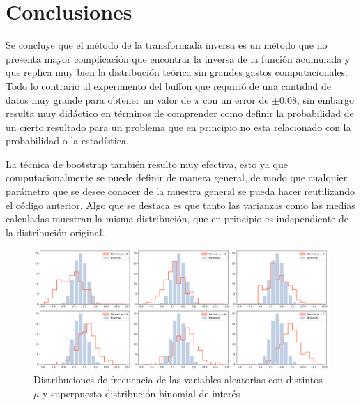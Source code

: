 \documentclass[baaa]{baaa}
\begin{document}
\section{Conclusiones}
Se concluye que el método de la transformada inversa es un método que no presenta mayor complicación que encontrar la inversa de la función acumulada y que replica muy bien la distribución teórica sin grandes gastos computacionales. Todo lo contrario al experimento del buffon que requirió de una cantidad de datos muy grande para obtener un valor de $\pi$ con un error de $\pm0.08$, sin embargo resulta muy didáctico en términos de comprender como definir la probabilidad de un cierto resultado para un problema que en principio no esta relacionado con la probabilidad o la estadística.

La técnica de bootstrap también resulto muy efectiva, esto ya que computacionalmente se puede definir de manera general, de modo que cualquier parámetro que se desee conocer de la muestra general se pueda hacer reutilizando el código anterior. Algo que se destaca es que tanto las varianzas como las medias calculadas muestran la misma distribución, que en principio es independiente de la distribución original.   



\begin{figure}
    \centering
    \includegraphics[width=\linewidth]{imagenes/binomial_vs_normal.png}
    \caption{Distribuciones de frecuencia de las variables aleatorias con distintos $\mu$ y superpuesto distribución binomial de interés}
    \label{fig:bin_vs_norm}
\end{figure}

\small
\end{document}
